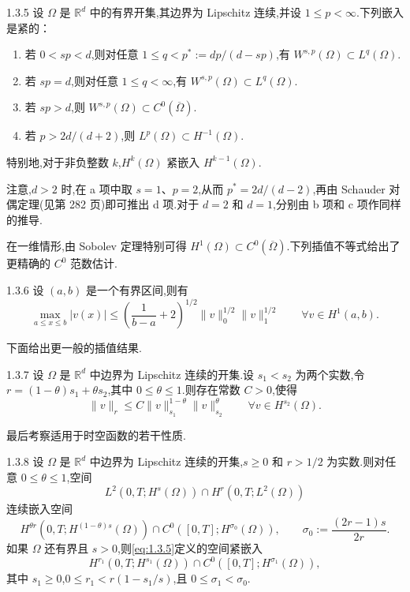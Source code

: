 \begin{theorem}{1.3.5}
设 \(\Omega\) 是 \(\mathbb R^d\) 中的有界开集,其边界为 Lipschitz 连续,并设 \(1\le p<\infty\).下列嵌入是紧的：
\begin{enumerate}[label=\alph*.,leftmargin=*]
  \item 若 \(0<sp<d\),则对任意 \(1\le q<p^*:=dp/(d-sp)\),有 \(W^{s,p}(\Omega)\subset L^q(\Omega)\).
  \item 若 \(sp=d\),则对任意 \(1\le q<\infty\),有 \(W^{s,p}(\Omega)\subset L^q(\Omega)\).
  \item 若 \(sp>d\),则 \(W^{s,p}(\Omega)\subset C^0(\overline\Omega)\).
  \item 若 \(p>2d/(d+2)\),则 \(L^p(\Omega)\subset H^{-1}(\Omega)\).
\end{enumerate}
特别地,对于非负整数 \(k\),\(H^k(\Omega)\) 紧嵌入 \(H^{k-1}(\Omega)\).
\end{theorem}

注意,\(d>2\) 时,在 a 项中取 \(s=1\)、\(p=2\),从而 \(p^*=2d/(d-2)\),再由 Schauder 对偶定理(见第 282 页)即可推出 d 项.对于 \(d=2\) 和 \(d=1\),分别由 b 项和 c 项作同样的推导.

在一维情形,由 Sobolev 定理特别可得 \(H^1(\Omega)\subset C^0(\overline\Omega)\).下列插值不等式给出了更精确的 \(C^0\) 范数估计.

\begin{theorem}{1.3.6}
设 \((a,b)\) 是一个有界区间,则有
\[
  \max_{a\le x\le b}|v(x)|
  \le\left(\frac1{b-a}+2\right)^{1/2}\|v\|_0^{1/2}\|v\|_1^{1/2}
  \qquad \forall v\in H^1(a,b).
\]
\end{theorem}

下面给出更一般的插值结果.

\begin{theorem}[插值定理]{1.3.7}
设 \(\Omega\) 是 \(\mathbb R^d\) 中边界为 Lipschitz 连续的开集.设 \(s_1<s_2\) 为两个实数,令 \(r=(1-\theta)s_1+\theta s_2\),其中 \(0\le\theta\le1\).则存在常数 \(C>0\),使得
\[
  \|v\|_r\le C\|v\|_{s_1}^{1-\theta}\|v\|_{s_2}^{\theta}
  \qquad \forall v\in H^{s_2}(\Omega).
\]
\end{theorem}

最后考察适用于时空函数的若干性质.

\begin{theorem}[]{1.3.8}
设 \(\Omega\) 是 \(\mathbb R^d\) 中边界为 Lipschitz 连续的开集,\(s\ge0\) 和 \(r>1/2\) 为实数.则对任意 \(0\le\theta\le1\),空间
\begin{equation}\label{eq:1.3.5}
  L^2(0,T;H^s(\Omega))\cap H^r(0,T;L^2(\Omega))
\end{equation}
连续嵌入空间
\[
  H^{\theta r}(0,T;H^{(1-\theta)s}(\Omega))\cap C^0([0,T];H^{\sigma_0}(\Omega)),
  \qquad \sigma_0:=\frac{(2r-1)s}{2r}.
\]
如果 \(\Omega\) 还有界且 \(s>0\),则\eqref{eq:1.3.5}定义的空间紧嵌入
\[
  H^{r_1}(0,T;H^{s_1}(\Omega))\cap C^0([0,T];H^{\sigma_1}(\Omega)),
\]
其中 \(s_1\ge0\),\(0\le r_1<r(1-s_1/s)\),且 \(0\le\sigma_1<\sigma_0\).
\end{theorem}

